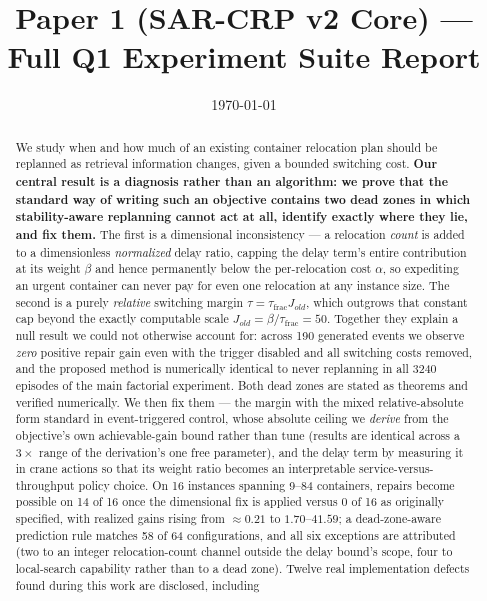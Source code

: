\documentclass[11pt]{article}
\title{Paper 1 (SAR-CRP v2 Core) --- Full Q1 Experiment Suite Report}
\author{}
\date{\today}
\begin{document}
\maketitle

\begin{abstract}
We study when and how much of an existing container relocation plan should
be replanned as retrieval information changes, given a bounded switching
cost. \textbf{Our central result is a diagnosis rather than an algorithm:
we prove that the standard way of writing such an objective contains two
dead zones in which stability-aware replanning cannot act at all, identify
exactly where they lie, and fix them.} The first is a dimensional
inconsistency --- a relocation \emph{count} is added to a dimensionless
\emph{normalized} delay ratio, capping the delay term's entire contribution
at its weight $\beta$ and hence permanently below the per-relocation cost
$\alpha$, so expediting an urgent container can never pay for even one
relocation at any instance size. The second is a purely \emph{relative}
switching margin $\tau = \tau_{\text{frac}} J_{old}$, which outgrows that
constant cap beyond the exactly computable scale
$J_{old} = \beta/\tau_{\text{frac}} = 50$. Together they explain a
null result we could not otherwise account for: across 190 generated events
we observe \emph{zero} positive repair gain even with the trigger disabled
and all switching costs removed, and the proposed method is numerically
identical to never replanning in all 3240 episodes of the main factorial
experiment. Both dead zones are stated as theorems and verified
numerically. We then fix them --- the margin with the mixed
relative-absolute form standard in event-triggered control, whose absolute
ceiling we \emph{derive} from the objective's own achievable-gain bound
rather than tune (results are identical across a $3\times$ range of the
derivation's one free parameter), and the delay term by measuring it in
crane actions so that its weight ratio becomes an interpretable
service-versus-throughput policy choice. On 16 instances spanning 9--84
containers, repairs become possible on 14 of 16 once the dimensional fix is
applied versus 0 of 16 as originally specified, with realized gains rising
from $\approx0.21$ to $1.70$--$41.59$; a dead-zone-aware prediction rule
matches 58 of 64 configurations, and all six exceptions are attributed
(two to an integer relocation-count channel outside the delay bound's
scope, four to local-search capability rather than to a dead zone). Twelve
real implementation defects found during this work are disclosed, including

\end{abstract}
\end{document}
